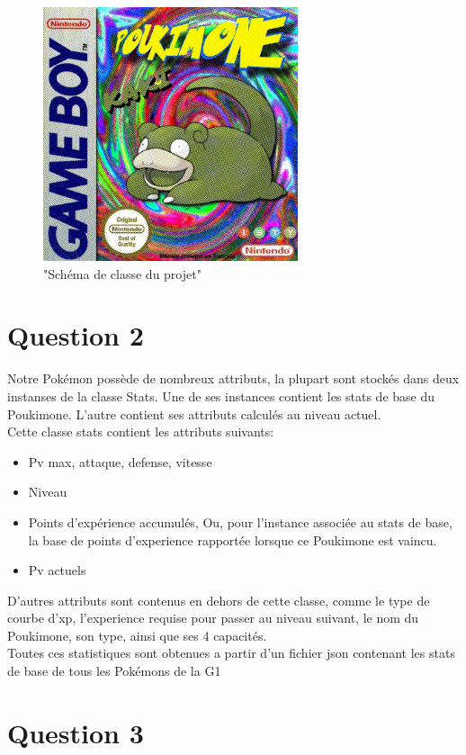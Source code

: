 \documentclass{report}
\begin{document}
\begin{figure}[ht!]
    \centering
    \includegraphics[width=75mm]{cover.jpg}
    \caption{"Schéma de classe du projet"}
\end{figure}
\section*{Question 2}
Notre Pokémon possède de nombreux attributs, la plupart sont stockés dans deux instanses de la classe Stats. Une de ses instances contient les stats de base du Poukimone. L'autre contient ses attributs calculés au niveau actuel.
\\Cette classe stats contient les attributs suivants:
\begin{itemize}
    \item{Pv max, attaque, defense, vitesse}
    \item{Niveau}
    \item{Points d'expérience accumulés, Ou, pour l'instance associée au stats de base, la base de points d'experience rapportée lorsque ce Poukimone est vaincu.}
    \item{Pv actuels}
\end{itemize}
D'autres attributs sont contenus en dehors de cette classe, comme le type de courbe d'xp, l'experience requise pour passer au niveau suivant, le nom du Poukimone, son type, ainsi que ses 4 capacités.
\\ Toutes ces statistiques sont obtenues a partir d'un fichier json contenant les stats de base de tous les Pokémons de la G1
\section*{Question 3}
\end{document}
